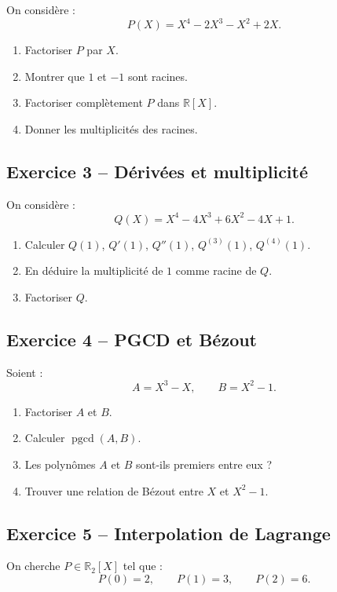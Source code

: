 \documentclass[11pt,a4paper]{article}
\newcommand{\R}{\mathbb R}
\newcommand{\pgcd}{\operatorname{pgcd}}
\begin{document}
On considère :
\[
P(X)=X^4-2X^3-X^2+2X.
\]

\begin{enumerate}
    \item Factoriser \(P\) par \(X\).
    \item Montrer que \(1\) et \(-1\) sont racines.
    \item Factoriser complètement \(P\) dans \(\R[X]\).
    \item Donner les multiplicités des racines.
\end{enumerate}

\subsection*{Exercice 3 -- Dérivées et multiplicité}

On considère :
\[
Q(X)=X^4-4X^3+6X^2-4X+1.
\]

\begin{enumerate}
    \item Calculer \(Q(1)\), \(Q'(1)\), \(Q''(1)\), \(Q^{(3)}(1)\), \(Q^{(4)}(1)\).
    \item En déduire la multiplicité de \(1\) comme racine de \(Q\).
    \item Factoriser \(Q\).
\end{enumerate}

\subsection*{Exercice 4 -- PGCD et Bézout}

Soient :
\[
A=X^3-X,
\qquad
B=X^2-1.
\]

\begin{enumerate}
    \item Factoriser \(A\) et \(B\).
    \item Calculer \(\pgcd(A,B)\).
    \item Les polynômes \(A\) et \(B\) sont-ils premiers entre eux ?
    \item Trouver une relation de Bézout entre \(X\) et \(X^2-1\).
\end{enumerate}

\subsection*{Exercice 5 -- Interpolation de Lagrange}

On cherche \(P\in\R_2[X]\) tel que :
\[
P(0)=2,\qquad
P(1)=3,\qquad
P(2)=6.
\]
\end{document}
